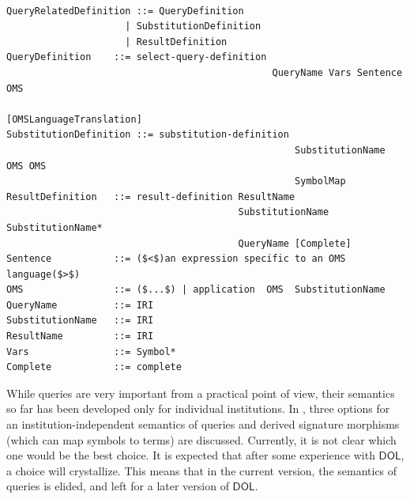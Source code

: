 \documentclass[10pt, a4paper]{isov2}
\newcommand*{\syntax}[1]{\texttt{#1}}
\newcommand{\semdom}[1]{
\begin{center}
\fbox{$#1$}
\end{center}
}
\newcommand*{\DOL}{\ensuremath{\mathsf{DOL}}\xspace}
\begin{document}


\begin{lstlisting}[language=ebnf,escapeinside={()},mathescape]  % abstract syntax

QueryRelatedDefinition ::= QueryDefinition
                     | SubstitutionDefinition
                     | ResultDefinition
QueryDefinition    ::= select-query-definition
                                               QueryName Vars Sentence OMS
                                               [OMSLanguageTranslation]
SubstitutionDefinition ::= substitution-definition
                                                   SubstitutionName OMS OMS
                                                   SymbolMap
ResultDefinition   ::= result-definition ResultName
                                         SubstitutionName SubstitutionName*
                                         QueryName [Complete]
Sentence           ::= ($<$)an expression specific to an OMS language($>$) 
OMS                ::= ($...$) | application  OMS  SubstitutionName 
QueryName          ::= IRI
SubstitutionName   ::= IRI
ResultName         ::= IRI
Vars               ::= Symbol*
Complete           ::= complete
\end{lstlisting}


\label{s:sem-queries}

While queries are very important from a practical point of view, their
semantics so far has been developed only for individual institutions.
In \cite{MossakowskiEtAl15a}, three options for an
institution-independent semantics of queries and derived signature
morphisms (which can map symbols to terms) are discussed. Currently,
it is not clear which one would be the best choice. It is expected
that after some experience with \DOL, a choice will crystallize. This
means that in the current version, the semantics of queries is
elided, and left for a later version of \DOL.

%
%
%
%
\end{document}
